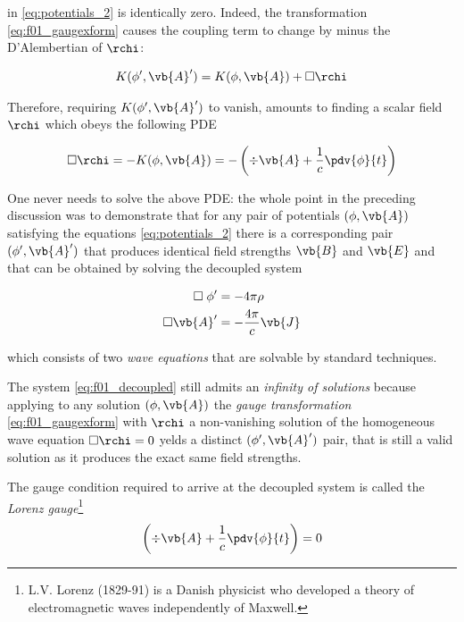 in \ref{eq:potentials_2} is identically zero. Indeed, the transformation \ref{eq:f01_gaugexform} causes the coupling term to change by minus the D'Alembertian of $\rchi$: 

\begin{align*}
K(\phi', \vb{A}') = K(\phi, \vb{A}) + \Box \rchi
\end{align*}

Therefore, requiring $K(\phi', \vb{A}')$ to vanish, amounts to finding a scalar field $\rchi$ which obeys the following PDE

\begin{equation}
\Box \rchi = - K(\phi, \vb{A}) = - \left( \div{\vb{A}} + \frac{1}{c} \pdv{\phi}{t}  \right)
\end{equation}

One never needs to solve the above PDE: the whole point in the preceding discussion was to demonstrate that for any pair of potentials $(\phi, \vb{A})$ satisfying the equations \ref{eq:potentials_2} there is a corresponding pair $(\phi', \vb{A}')$ that produces identical field strengths $\vb{B}$ and $\vb{E}$ and that can be obtained by solving the decoupled system

\begin{equation}
\begin{aligned}
\Box \;\phi' &= - 4\pi\rho \\
\Box \vb{A}' &= - \frac{4 \pi}{c} \vb{J}
\end{aligned}
\label{eq:f01_decoupled}
\end{equation}

which consists of two \textit{wave equations} that are solvable by standard techniques.

The system \ref{eq:f01_decoupled} still admits an \textit{infinity of solutions} because applying to any solution $(\phi, \vb{A})$ the \textit{gauge transformation} \ref{eq:f01_gaugexform} with $\rchi$ a non-vanishing solution of the homogeneous wave equation $\Box \rchi =0$ yelds a distinct $(\phi', \vb{A}')$ pair, that is still a valid solution as it produces the exact same field strengths.

The gauge condition required to arrive at the decoupled system is called the \textit{Lorenz gauge}\footnote{L.V. Lorenz (1829-91) is a Danish physicist who developed a theory of electromagnetic waves independently of Maxwell.} 
\begin{equation}
\left( \div{\vb{A}} + \frac{1}{c} \pdv{\phi}{t}  \right) = 0
\label{eq:f01_lorenzgauge}
\end{equation}

